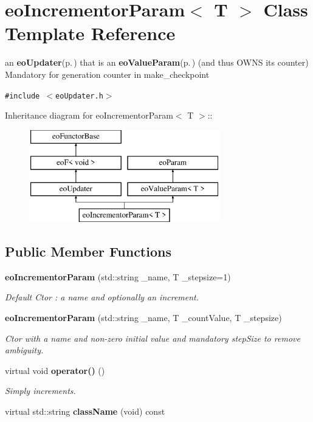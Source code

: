 \section{eo\-Incrementor\-Param$<$ T $>$ Class Template Reference}
\label{classeo_incrementor_param}
an {\bf eo\-Updater}{\rm (p.\,\pageref{classeo_updater})} that is an {\bf eo\-Value\-Param}{\rm (p.\,\pageref{classeo_value_param})} (and thus OWNS its counter) Mandatory for generation counter in make\_\-checkpoint  


{\tt \#include $<$eo\-Updater.h$>$}

Inheritance diagram for eo\-Incrementor\-Param$<$ T $>$::\begin{figure}[H]
\begin{center}
\leavevmode
\includegraphics[height=4cm]{classeo_incrementor_param}
\end{center}
\end{figure}
\subsection*{Public Member Functions}
\begin{CompactItemize}
\item 
{\bf eo\-Incrementor\-Param} (std::string \_\-name, T \_\-stepsize=1)\label{classeo_incrementor_param_a0}

\begin{CompactList}\small\item\em Default Ctor : a name and optionally an increment. \item\end{CompactList}\item 
{\bf eo\-Incrementor\-Param} (std::string \_\-name, T \_\-count\-Value, T \_\-stepsize)\label{classeo_incrementor_param_a1}

\begin{CompactList}\small\item\em Ctor with a name and non-zero initial value and mandatory step\-Size to remove ambiguity. \item\end{CompactList}\item 
virtual void {\bf operator()} ()\label{classeo_incrementor_param_a2}

\begin{CompactList}\small\item\em Simply increments. \item\end{CompactList}\item 
virtual std::string {\bf class\-Name} (void) const \label{classeo_incrementor_param_a3}

\end{CompactItemize}
